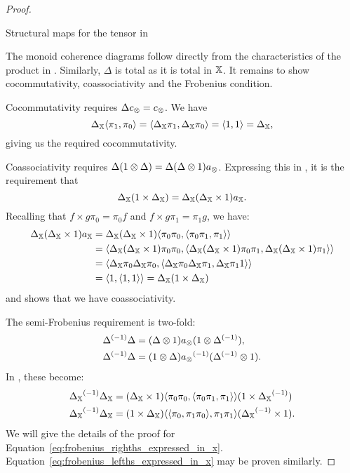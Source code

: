 \begin{proof}
\begin{table}[!htbp]
\begin{center}
    \end{center}
    \caption{Structural maps for the tensor in \Invc{\X}}
    \label{tab:structural_maps_for_the_tensor_in_invx}
  \end{table}

  The monoid coherence diagrams follow directly from the characteristics of the product in
  \X. Similarly, $\Delta$ is total as it is total in $\mathbb{X}$. It remains to show cocommutativity,
  coassociativity and the Frobenius condition.

  Cocommutativity requires $\Delta c_{\otimes} = c_{\otimes}$. We have
  \[
     \Delta_{\mathbb{X}} \langle \pi_1,\pi_0\rangle = \langle\Delta_{\mathbb{X}}\pi_1, \Delta_{\mathbb{X}}\pi_0\rangle = \langle1,1\rangle =
     \Delta_{\mathbb{X}},
  \]
  giving us the required cocommutativity.

  Coassociativity requires $\Delta (1 \otimes \Delta) = \Delta (\Delta \otimes 1) a_{\otimes}$. Expressing this
  in \X, it is the requirement that
  \[
    \Delta_{\mathbb{X}} (1 \times \Delta_{\mathbb{X}}) =
      \Delta_{\mathbb{X}}(\Delta_{\mathbb{X}} \times 1) a_{\mathbb{X}}.
  \]
  Recalling that $f\times g \pi_0 = \pi_0 f$ and $f\times g \pi_1 = \pi_1 g$, we have:
  \begin{align*}
    \Delta_{\mathbb{X}}(\Delta_{\mathbb{X}} \times 1) a_{\mathbb{X}} &=\Delta_{\mathbb{X}}(\Delta_{\mathbb{X}} \times 1)
    \langle\pi_0\pi_0,\langle\pi_0\pi_1,\pi_1\rangle\rangle\\
    &= \langle\Delta_{\mathbb{X}}(\Delta_{\mathbb{X}} \times 1)\pi_0\pi_0,\langle\Delta_{\mathbb{X}}(\Delta_{\mathbb{X}} \times 1)\pi_0\pi_1,\Delta_{\mathbb{X}}(\Delta_{\mathbb{X}} \times 1)\pi_1\rangle\rangle\\
    &= \langle\Delta_{\mathbb{X}}\pi_0\Delta_{\mathbb{X}}\pi_0,\langle\Delta_{\mathbb{X}}\pi_0\Delta_{\mathbb{X}}\pi_1,\Delta_{\mathbb{X}}\pi_1 1\rangle\rangle\\
    &= \langle1, \langle1,1\rangle\rangle = \Delta_{\mathbb{X}}(1\times\Delta_{\mathbb{X}})
  \end{align*}
  and shows that we have coassociativity.

  The semi-Frobenius requirement is two-fold:
  \begin{align}
    {\Delta}^{(-1)} \Delta &= (\Delta \otimes1) a_{\otimes}(1\otimes{\Delta}^{(-1)}), \label{eq:frobenius_righths_need_in_invx}\\
    {\Delta}^{(-1)} \Delta &= (1 \otimes \Delta) {a_{\otimes}}^{(-1)}({\Delta}^{(-1)}\otimes 1) \label{eq:frobenius_lefths_need_in_invx}.
  \end{align}
  In \X, these become:
  \begin{align}
    {\Delta_{\ensuremath{\mathbb{X}}}}^{(-1)} \Delta_{\mathbb{X}}
      &= (\Delta_{\mathbb{X}} \times 1) \langle\pi_0 \pi_0,\langle\pi_0 \pi_1,\pi_1\rangle\rangle(1\times{\Delta_{\ensuremath{\mathbb{X}}}}^{(-1)})
      \label{eq:frobenius_righths_expressed_in_x}\\
    {\Delta_{\mathbb{X}}}^{(-1)}\Delta_{\mathbb{X}}
      &= (1 \times \Delta_{\mathbb{X}}) \langle\langle\pi_0, \pi_1 \pi_0\rangle,\pi_1 \pi_1\rangle({\Delta_{\mathbb{X}}}^{(-1)}\times 1).
      \label{eq:frobenius_lefths_expressed_in_x}
  \end{align}
  We will give the details of the proof for Equation~\ref{eq:frobenius_righths_expressed_in_x}.
  Equation~\ref{eq:frobenius_lefths_expressed_in_x} may be proven similarly.


\end{proof}
